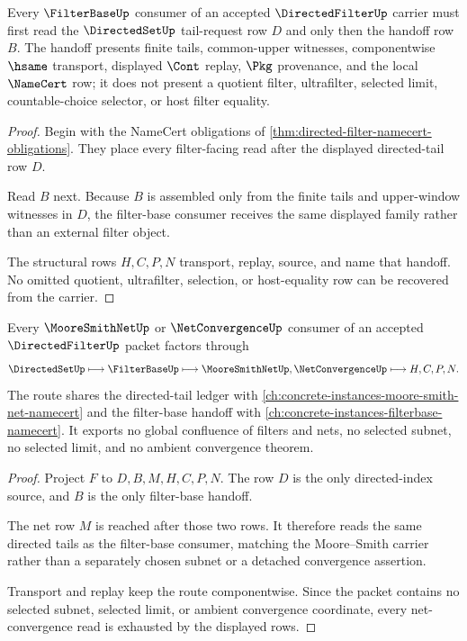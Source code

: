 \begin{theorem}\label{thm:directed-filter-tail-filterbase-handoff}
Every $\FilterBaseUp$ consumer of an accepted $\DirectedFilterUp$ carrier must first read the $\DirectedSetUp$ tail-request row $D$ and only then the handoff row $B$. The handoff presents finite tails, common-upper witnesses, componentwise $\hsame$ transport, displayed $\Cont$ replay, $\Pkg$ provenance, and the local $\NameCert$ row; it does not present a quotient filter, ultrafilter, selected limit, countable-choice selector, or host filter equality.
\end{theorem}
\begin{proof}
Begin with the NameCert obligations of \autoref{thm:directed-filter-namecert-obligations}. They place every filter-facing read after the displayed directed-tail row $D$.

Read $B$ next. Because $B$ is assembled only from the finite tails and upper-window witnesses in $D$, the filter-base consumer receives the same displayed family rather than an external filter object.

The structural rows $H,C,P,N$ transport, replay, source, and name that handoff. No omitted quotient, ultrafilter, selection, or host-equality row can be recovered from the carrier.
\end{proof}

\begin{theorem}\label{thm:directed-filter-net-convergence-route}
Every $\MooreSmithNetUp$ or $\NetConvergenceUp$ consumer of an accepted $\DirectedFilterUp$ packet factors through
$$
\DirectedSetUp \longmapsto \FilterBaseUp \longmapsto \MooreSmithNetUp,\NetConvergenceUp \longmapsto H,C,P,N .
$$
The route shares the directed-tail ledger with \autoref{ch:concrete-instances-moore-smith-net-namecert} and the filter-base handoff with \autoref{ch:concrete-instances-filterbase-namecert}. It exports no global confluence of filters and nets, no selected subnet, no selected limit, and no ambient convergence theorem.
\end{theorem}
\begin{proof}
Project $F$ to $D,B,M,H,C,P,N$. The row $D$ is the only directed-index source, and $B$ is the only filter-base handoff.

The net row $M$ is reached after those two rows. It therefore reads the same directed tails as the filter-base consumer, matching the Moore--Smith carrier rather than a separately chosen subnet or a detached convergence assertion.

Transport and replay keep the route componentwise. Since the packet contains no selected subnet, selected limit, or ambient convergence coordinate, every net-convergence read is exhausted by the displayed rows.
\end{proof}


